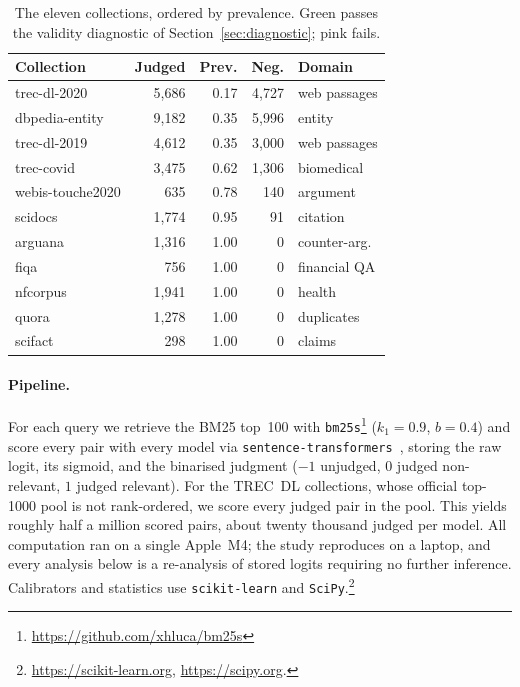 \documentclass[sigconf,nonacm]{acmart}
\newcommand{\thead}[1]{\textbf{#1}}
\begin{document}
\begin{table}[t]
\centering
\caption{The eleven collections, ordered by prevalence.
\textcolor{green!50!black}{Green} passes the validity diagnostic of
Section~\ref{sec:diagnostic}; \textcolor{red!50!black}{pink} fails.}
\label{tab:collections}
\small
\begin{tabular}{lrrrl}
\toprule
\thead{Collection} & \thead{Judged} & \thead{Prev.} & \thead{Neg.} & \thead{Domain} \\
\midrule
\rowcolor{cleangreen}
trec-dl-2020     & 5{,}686 & 0.17 & 4{,}727 & web passages \\
\rowcolor{cleangreen}
dbpedia-entity   & 9{,}182 & 0.35 & 5{,}996 & entity \\
\rowcolor{cleangreen}
trec-dl-2019     & 4{,}612 & 0.35 & 3{,}000 & web passages \\
\rowcolor{cleangreen}
trec-covid       & 3{,}475 & 0.62 & 1{,}306 & biomedical \\
\rowcolor{cleangreen}
webis-touche2020 & 635     & 0.78 & 140     & argument \\
\rowcolor{singleclasspink}
scidocs          & 1{,}774 & 0.95 & 91      & citation \\
\rowcolor{singleclasspink}
arguana          & 1{,}316 & 1.00 & 0       & counter-arg. \\
\rowcolor{singleclasspink}
fiqa             & 756     & 1.00 & 0       & financial QA \\
\rowcolor{singleclasspink}
nfcorpus         & 1{,}941 & 1.00 & 0       & health \\
\rowcolor{singleclasspink}
quora            & 1{,}278 & 1.00 & 0       & duplicates \\
\rowcolor{singleclasspink}
scifact          & 298     & 1.00 & 0       & claims \\
\bottomrule
\end{tabular}
\end{table}

\paragraph{Pipeline.}
For each query we retrieve the BM25 top~100 with \texttt{bm25s}\footnote{\url{https://github.com/xhluca/bm25s}} ($k_1{=}0.9$, $b{=}0.4$) and score every pair with every model via \texttt{sentence-transformers}~\cite{reimers2019sbert}, storing the raw logit, its sigmoid, and the
binarised judgment ($-1$ unjudged, $0$ judged non-relevant, $1$ judged relevant). For
the TREC~DL collections, whose official top-1000 pool is not rank-ordered, we score
every judged pair in the pool. This yields roughly half a million scored pairs, about
twenty thousand judged per model. All computation ran on a single Apple~M4; the study
reproduces on a laptop, and every analysis below is a re-analysis of stored logits
requiring no further inference. Calibrators and statistics use \texttt{scikit-learn} and \texttt{SciPy}.\footnote{\url{https://scikit-learn.org}, \url{https://scipy.org}.}
\end{document}
